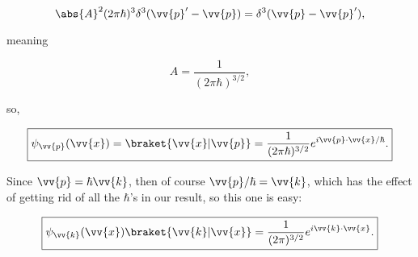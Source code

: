 \begin{parts}
  \begin{equation}
    \abs{A}^2(2\pi\hbar)^3\delta^3(\vv{p}' - \vv{p}) = \delta^3(\vv{p} - \vv{p}'),
  \end{equation}

  meaning

  \begin{equation}
    A = \frac{1}{(2\pi\hbar)^{3/2}},
  \end{equation}

  so,

  \begin{equation}
    \boxed{\psi_{\vv{p}}(\vv{x}) = \braket{\vv{x} | \vv{p}} = \frac{1}{(2\pi\hbar)^{3/2}}e^{i\vv{p}\cdot\vv{x}/\hbar}.}
  \end{equation}


\item Since $\vv{p} = \hbar\vv{k}$, then of course $\vv{p}/\hbar = \vv{k}$, which has the effect of getting rid of all the $\hbar$'s in our result, so this one is easy:

  \begin{equation}
    \boxed{\psi_{\vv{k}}(\vv{x}) \braket{\vv{k} | \vv{x}} = \frac{1}{(2\pi)^{3/2}}e^{i\vv{k}\cdot\vv{x}}.}
  \end{equation}
  
  
\end{parts}
